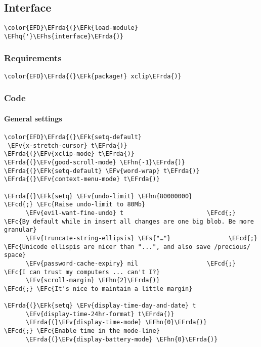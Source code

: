 \documentclass[a4wide,10pt]{article}
\newcommand{\EFc}[1]{\textcolor{EFc}{#1}} %
\newcommand{\EFcd}[1]{\textcolor{EFcd}{#1}} %
\newcommand{\EFs}[1]{\textcolor{EFs}{#1}} %
\newcommand{\EFk}[1]{\textcolor{EFk}{#1}} %
\newcommand{\EFv}[1]{\textcolor{EFv}{#1}} %
\newcommand{\EFhn}[1]{\textcolor{EFhn}{\textbf{#1}}} %
\newcommand{\EFhq}[1]{\textcolor{EFhq}{#1}} %
\newcommand{\EFhs}[1]{\textcolor{EFhs}{#1}} %
\newcommand{\EFrda}[1]{\textcolor{EFrda}{#1}} %
\begin{document}
\subsection{Interface}
\label{sec:org38b0c2b}
\begin{Code}
\begin{Verbatim}
\color{EFD}\EFrda{(}\EFk{load-module} \EFhq{'}\EFhs{interface}\EFrda{)}
\end{Verbatim}
\end{Code}
\subsubsection{Requirements}
\label{sec:orgb34c1c8}
\begin{Code}
\begin{Verbatim}
\color{EFD}\EFrda{(}\EFk{package!} xclip\EFrda{)}
\end{Verbatim}
\end{Code}
\subsubsection{Code}
\label{sec:org1e78471}
\paragraph{General settings}
\label{sec:orgc4d73e8}
\begin{Code}
\begin{Verbatim}
\color{EFD}\EFrda{(}\EFk{setq-default}
 \EFv{x-stretch-cursor} t\EFrda{)}
\EFrda{(}\EFv{xclip-mode} t\EFrda{)}
\EFrda{(}\EFv{good-scroll-mode} \EFhn{-1}\EFrda{)}
\EFrda{(}\EFk{setq-default} \EFv{word-wrap} t\EFrda{)}
\EFrda{(}\EFv{context-menu-mode} t\EFrda{)}

\EFrda{(}\EFk{setq} \EFv{undo-limit} \EFhn{80000000}                         \EFcd{;} \EFc{Raise undo-limit to 80Mb}
      \EFv{evil-want-fine-undo} t                       \EFcd{;} \EFc{By default while in insert all changes are one big blob. Be more granular}
      \EFv{truncate-string-ellipsis} \EFs{"…"}                \EFcd{;} \EFc{Unicode ellispis are nicer than "...", and also save /precious/ space}
      \EFv{password-cache-expiry} nil                   \EFcd{;} \EFc{I can trust my computers ... can't I?}
      \EFv{scroll-margin} \EFhn{2}\EFrda{)}                            \EFcd{;} \EFc{It's nice to maintain a little margin}

\EFrda{(}\EFk{setq} \EFv{display-time-day-and-date} t
      \EFv{display-time-24hr-format} t\EFrda{)}
      \EFrda{(}\EFv{display-time-mode} \EFhn{0}\EFrda{)}                             \EFcd{;} \EFc{Enable time in the mode-line}
      \EFrda{(}\EFv{display-battery-mode} \EFhn{0}\EFrda{)}
\end{Verbatim}
\end{Code}
\end{document}
